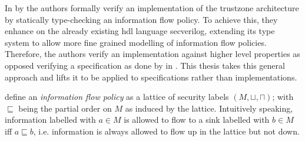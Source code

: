 
In  \cite{Ferraiuolo17} by \citeauthor{Ferraiuolo17} the authors formally verify an implementation of the \gls{trustzone} architecture by statically type-checking an information flow policy.
To achieve this, they enhance on the already existing \gls{hdl} language \gls{secverilog}, extending its type system to allow more fine grained modelling of information flow policies.
Therefore, the authors verify an implementation against higher level properties as opposed verifying a specification as done by \citeauthor{Reid17} in \cite{Reid17}.
This thesis takes this general approach and lifts it to be applied to specifications rather than implementations.

\citeauthor{Ferraiuolo17} define an \textit{information flow policy} as a lattice of security labels $ (M, \sqcup, \sqcap) $; with $ \sqsubseteq $ being the partial order on $ M $ as induced by the lattice.
Intuitively speaking, information labelled with $ a \in M $ is allowed to flow to a sink labelled with $ b \in M $ iff $ a \sqsubseteq b $, i.e. information is always allowed to flow up in the lattice but not down.

